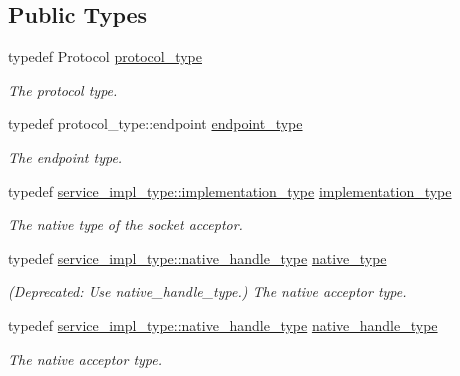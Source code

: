 \subsection*{Public Types}
\begin{DoxyCompactItemize}
\item 
typedef Protocol \hyperlink{classasio_1_1socket__acceptor__service_a2622e1b415ef0257f92e1d586cc25641}{protocol\+\_\+type}
\begin{DoxyCompactList}\small\item\em The protocol type. \end{DoxyCompactList}\item 
typedef protocol\+\_\+type\+::endpoint \hyperlink{classasio_1_1socket__acceptor__service_a2e266541d8da5db4af397b4a62bc3923}{endpoint\+\_\+type}
\begin{DoxyCompactList}\small\item\em The endpoint type. \end{DoxyCompactList}\item 
typedef \hyperlink{structasio_1_1detail_1_1reactive__socket__service_1_1implementation__type}{service\+\_\+impl\+\_\+type\+::implementation\+\_\+type} \hyperlink{classasio_1_1socket__acceptor__service_ae91b355a38c59424f68df71fcd9fffb8}{implementation\+\_\+type}
\begin{DoxyCompactList}\small\item\em The native type of the socket acceptor. \end{DoxyCompactList}\item 
typedef \hyperlink{classasio_1_1detail_1_1reactive__socket__service_a2fc869359f3eb7b6f25925f10e594e1d}{service\+\_\+impl\+\_\+type\+::native\+\_\+handle\+\_\+type} \hyperlink{classasio_1_1socket__acceptor__service_a26cf6dae27417c057eca8c60a65950ed}{native\+\_\+type}
\begin{DoxyCompactList}\small\item\em (Deprecated\+: Use native\+\_\+handle\+\_\+type.) The native acceptor type. \end{DoxyCompactList}\item 
typedef \hyperlink{classasio_1_1detail_1_1reactive__socket__service_a2fc869359f3eb7b6f25925f10e594e1d}{service\+\_\+impl\+\_\+type\+::native\+\_\+handle\+\_\+type} \hyperlink{classasio_1_1socket__acceptor__service_a48826fea49fd08ba8d3ee51697f1a092}{native\+\_\+handle\+\_\+type}
\begin{DoxyCompactList}\small\item\em The native acceptor type. \end{DoxyCompactList}\end{DoxyCompactItemize}
